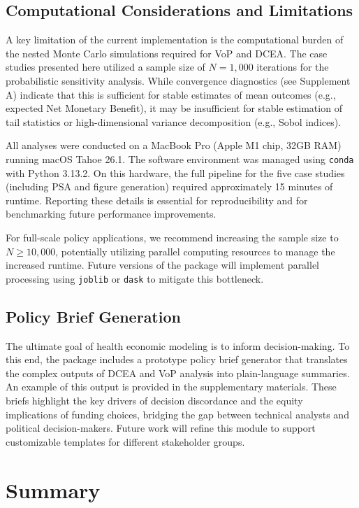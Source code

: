 \documentclass{article}
\newcommand{\pkg}[1]{\texttt{#1}}
\begin{document}
\subsection{Computational Considerations and Limitations}
A key limitation of the current implementation is the computational burden of the nested Monte Carlo simulations required for VoP and DCEA.
The case studies presented here utilized a sample size of $N=1,000$ iterations for the probabilistic sensitivity analysis.
While convergence diagnostics (see Supplement A) indicate that this is sufficient for stable estimates of mean outcomes (e.g., expected Net Monetary Benefit), it may be insufficient for stable estimation of tail statistics or high-dimensional variance decomposition (e.g., Sobol indices).

All analyses were conducted on a MacBook Pro (Apple M1 chip, 32GB RAM) running macOS Tahoe 26.1.
The software environment was managed using \pkg{conda} with Python 3.13.2.
On this hardware, the full pipeline for the five case studies (including PSA and figure generation) required approximately 15 minutes of runtime.
Reporting these details is essential for reproducibility and for benchmarking future performance improvements.

For full-scale policy applications, we recommend increasing the sample size to $N \ge 10,000$, potentially utilizing parallel computing resources to manage the increased runtime.
Future versions of the package will implement parallel processing using \pkg{joblib} or \pkg{dask} to mitigate this bottleneck.

\subsection{Policy Brief Generation}
The ultimate goal of health economic modeling is to inform decision-making.
To this end, the package includes a prototype policy brief generator that translates the complex outputs of DCEA and VoP analysis into plain-language summaries.
An example of this output is provided in the supplementary materials.
These briefs highlight the key drivers of decision discordance and the equity implications of funding choices, bridging the gap between technical analysts and political decision-makers.
Future work will refine this module to support customizable templates for different stakeholder groups.

\section{Summary} \label{sec:summary}
\end{document}
